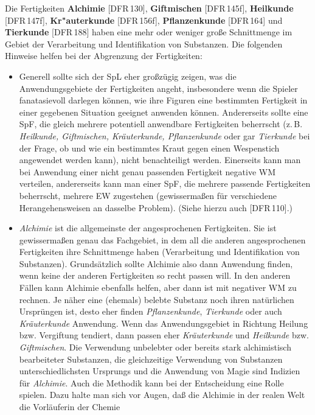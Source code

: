 \documentclass[10pt,a4paper,germanpar]{article}
\begin{document}
Die Fertigkeiten \textbf{Alchimie} [DFR\,130], \textbf{Giftmischen}
[DFR\,145f], \textbf{Heilkunde} [DFR\,147f], \textbf{Kr"auterkunde}
[DFR\,156f], \textbf{Pflanzenkunde} [DFR\,164] und \textbf{Tierkunde}
[DFR\,188] haben eine mehr oder weniger große Schnittmenge im Gebiet
der Verarbeitung und Identifikation von Substanzen. Die folgenden
Hinweise helfen bei der Abgrenzung der Fertigkeiten:
\begin{itemize}
\item Generell sollte sich der SpL eher großzügig zeigen, was die
  Anwendungsgebiete der Fertigkeiten angeht, insbesondere wenn die
  Spieler fanatasievoll darlegen können, wie ihre Figuren eine
  bestimmten Fertigkeit in einer gegebenen Situation geeignet anwenden
  können. Andererseits sollte eine SpF, die gleich mehrere potentiell
  anwendbare Fertigkeiten beherrscht (z.\,B. \emph{Heilkunde,
  Giftmischen, Kräuterkunde, Pflanzenkunde} oder gar \emph{Tierkunde}
  bei der Frage, ob und wie ein bestimmtes Kraut gegen einen
  Wespenstich angewendet werden kann), nicht benachteiligt werden.
  Einerseits kann man bei Anwendung einer nicht genau passenden
  Fertigkeit negative WM verteilen, andererseits kann man einer SpF,
  die mehrere passende Fertigkeiten beherrscht, mehrere EW zugestehen
  (gewissermaßen für verschiedene Herangehensweisen an dasselbe
  Problem). (Siehe hierzu auch [DFR\,110].)
\item \emph{Alchimie} ist die allgemeinste der angesprochenen
  Fertigkeiten. Sie ist gewissermaßen genau das Fachgebiet, in dem all
  die anderen angesprochenen Fertigkeiten ihre Schnittmenge haben
  (Verarbeitung und Identifikation von Substanzen). Grundsätzlich
  sollte Alchimie also dann Anwendung finden, wenn keine der anderen
  Fertigkeiten so recht passen will. In den anderen Fällen kann
  Alchimie ebenfalls helfen, aber dann ist mit negativer WM zu
  rechnen. Je näher eine (ehemals) belebte Substanz noch ihren
  natürlichen Ursprüngen ist, desto eher finden \emph{Pflanzenkunde},
  \emph{Tierkunde} oder auch \emph{Kräuterkunde} Anwendung. Wenn das
  Anwendungsgebiet in Richtung Heilung bzw. Vergiftung tendiert, dann
  passen eher \emph{Kräuterkunde} und \emph{Heilkunde} bzw.
  \emph{Giftmischen}. Die Verwendung unbelebter oder bereits stark
  alchimistisch bearbeiteter Substanzen, die gleichzeitige Verwendung
  von Substanzen unterschiedlichsten Ursprungs und die Anwendung von
  Magie sind Indizien für \emph{Alchimie}. Auch die Methodik kann bei
  der Entscheidung eine Rolle spielen. Dazu halte man sich vor Augen,
  daß die Alchimie in der realen Welt die Vorläuferin der Chemie

\end{itemize}
\end{document}
